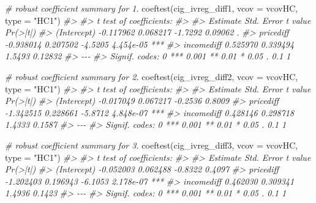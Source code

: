 \documentclass[
  14pt,
]{memoir}
\newenvironment{Shaded}{\begin{snugshade}}{\end{snugshade}}
\newcommand{\AttributeTok}[1]{\textcolor[rgb]{0.77,0.63,0.00}{#1}}
\newcommand{\CommentTok}[1]{\textcolor[rgb]{0.56,0.35,0.01}{\textit{#1}}}
\newcommand{\FunctionTok}[1]{\textcolor[rgb]{0.00,0.00,0.00}{#1}}
\newcommand{\NormalTok}[1]{#1}
\newcommand{\StringTok}[1]{\textcolor[rgb]{0.31,0.60,0.02}{#1}}
\begin{document}
\begin{Shaded}
\begin{Highlighting}[]
\CommentTok{\# robust coefficient summary for 1.}
\FunctionTok{coeftest}\NormalTok{(cig\_ivreg\_diff1, }\AttributeTok{vcov =}\NormalTok{ vcovHC, }\AttributeTok{type =} \StringTok{"HC1"}\NormalTok{)}
\CommentTok{\#\textgreater{} }
\CommentTok{\#\textgreater{} t test of coefficients:}
\CommentTok{\#\textgreater{} }
\CommentTok{\#\textgreater{}              Estimate Std. Error t value  Pr(\textgreater{}|t|)    }
\CommentTok{\#\textgreater{} (Intercept) {-}0.117962   0.068217 {-}1.7292   0.09062 .  }
\CommentTok{\#\textgreater{} pricediff   {-}0.938014   0.207502 {-}4.5205 4.454e{-}05 ***}
\CommentTok{\#\textgreater{} incomediff   0.525970   0.339494  1.5493   0.12832    }
\CommentTok{\#\textgreater{} {-}{-}{-}}
\CommentTok{\#\textgreater{} Signif. codes:  0 \textquotesingle{}***\textquotesingle{} 0.001 \textquotesingle{}**\textquotesingle{} 0.01 \textquotesingle{}*\textquotesingle{} 0.05 \textquotesingle{}.\textquotesingle{} 0.1 \textquotesingle{} \textquotesingle{} 1}

\CommentTok{\# robust coefficient summary for 2.}
\FunctionTok{coeftest}\NormalTok{(cig\_ivreg\_diff2, }\AttributeTok{vcov =}\NormalTok{ vcovHC, }\AttributeTok{type =} \StringTok{"HC1"}\NormalTok{)}
\CommentTok{\#\textgreater{} }
\CommentTok{\#\textgreater{} t test of coefficients:}
\CommentTok{\#\textgreater{} }
\CommentTok{\#\textgreater{}              Estimate Std. Error t value  Pr(\textgreater{}|t|)    }
\CommentTok{\#\textgreater{} (Intercept) {-}0.017049   0.067217 {-}0.2536    0.8009    }
\CommentTok{\#\textgreater{} pricediff   {-}1.342515   0.228661 {-}5.8712 4.848e{-}07 ***}
\CommentTok{\#\textgreater{} incomediff   0.428146   0.298718  1.4333    0.1587    }
\CommentTok{\#\textgreater{} {-}{-}{-}}
\CommentTok{\#\textgreater{} Signif. codes:  0 \textquotesingle{}***\textquotesingle{} 0.001 \textquotesingle{}**\textquotesingle{} 0.01 \textquotesingle{}*\textquotesingle{} 0.05 \textquotesingle{}.\textquotesingle{} 0.1 \textquotesingle{} \textquotesingle{} 1}

\CommentTok{\# robust coefficient summary for 3.}
\FunctionTok{coeftest}\NormalTok{(cig\_ivreg\_diff3, }\AttributeTok{vcov =}\NormalTok{ vcovHC, }\AttributeTok{type =} \StringTok{"HC1"}\NormalTok{)}
\CommentTok{\#\textgreater{} }
\CommentTok{\#\textgreater{} t test of coefficients:}
\CommentTok{\#\textgreater{} }
\CommentTok{\#\textgreater{}              Estimate Std. Error t value  Pr(\textgreater{}|t|)    }
\CommentTok{\#\textgreater{} (Intercept) {-}0.052003   0.062488 {-}0.8322    0.4097    }
\CommentTok{\#\textgreater{} pricediff   {-}1.202403   0.196943 {-}6.1053 2.178e{-}07 ***}
\CommentTok{\#\textgreater{} incomediff   0.462030   0.309341  1.4936    0.1423    }
\CommentTok{\#\textgreater{} {-}{-}{-}}
\CommentTok{\#\textgreater{} Signif. codes:  0 \textquotesingle{}***\textquotesingle{} 0.001 \textquotesingle{}**\textquotesingle{} 0.01 \textquotesingle{}*\textquotesingle{} 0.05 \textquotesingle{}.\textquotesingle{} 0.1 \textquotesingle{} \textquotesingle{} 1}
\end{Highlighting}
\end{Shaded}
\end{document}
